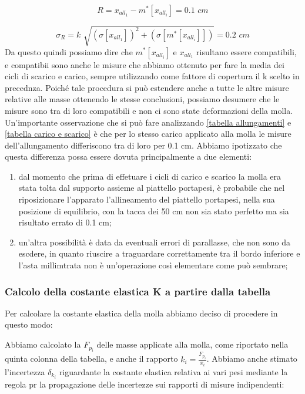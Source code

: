 \begin{equation*}
	R = x_{all_1} - m^*[x_{all_i}] = 0.1 \,\,cm
\end{equation*}

\begin{equation*}
	\sigma_{R} = k\,\, \sqrt{(\sigma[x_{all_1}])^2 + (\sigma[m^*[x_{all_i}]])} = 0.2 \,\,cm
\end{equation*}
Da questo quindi possiamo dire che $m^*[x_{all_i}]$ e $x_{all_1}$ risultano essere compatibili, e compatibii sono anche le misure che abbiamo ottenuto per fare la media dei cicli di scarico e carico, sempre utilizzando come fattore di copertura il k scelto in precednza.
Poiché tale procedura si può estendere anche a tutte le altre misure relative alle masse ottenendo le stesse conclusioni, possiamo desumere che le misure sono tra di loro compatibili e non ci sono state deformazioni della molla.
Un'importante osservazione che si può fare analizzando \ref{tabella allungamenti} e \ref{tabella carico e scarico} è che per lo stesso carico applicato alla molla le misure dell'allungamento differiscono tra di loro per 0.1 cm. Abbiamo ipotizzato che questa differenza possa essere dovuta principalmente a due elementi:

\begin{enumerate}
	\item{dal momento che prima di effetuare i cicli di carico e scarico la molla era stata tolta dal supporto assieme al piattello portapesi, è probabile che nel riposizionare l'apparato l'allineamento del piattello portapesi, nella sua posizione di equilibrio, con la tacca dei 50 cm non sia stato perfetto ma sia risultato errato di 0.1 cm;}
	\item{un'altra possibilità è data da eventuali errori di parallasse, che non sono da escdere, in quanto riuscire a traguardare correttamente tra il bordo inferiore e l'asta millimtrata non è un'operazione così elementare come può sembrare;}
\end{enumerate}

\subsubsection{Calcolo della costante elastica K a partire dalla tabella}
Per calcolare la costante elastica della molla abbiamo deciso di procedere in questo modo:

Abbiamo calcolato la $F_{p_{i}}$ delle masse applicate alla molla, come riportato nella quinta colonna della tabella, e anche il rapporto $k_{i} = \frac{F_{p_{i}}}{x_{i}}$. Abbiamo anche stimato l'incertezza $\delta_{k_{i}}$ riguardante la costante elastica relativa ai vari pesi mediante la regola pr la propagazione delle incertezze sui rapporti di misure indipendenti:

